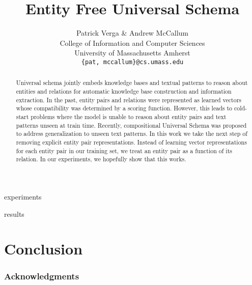 \documentclass{article} %
\title{Entity Free Universal Schema}
\author{Patrick Verga \& Andrew McCallum \\
    College of Information and Computer Sciences\\
    University of Massachusetts Amherst\\
    \texttt{\{pat, mccallum\}@cs.umass.edu} \\
}
\begin{document}
\maketitle

\begin{abstract}
Universal schema jointly embeds knowledge bases and textual patterns to reason about entities and relations for automatic knowledge base construction and information extraction. In the past, entity pairs and relations were represented as learned vectors whose compatibility was determined by a scoring function. However, this leads to cold-start problems where the model is unable to reason about entity pairs and text patterns unseen at train time. Recently, compositional Universal Schema was proposed to address generalization to unseen text patterns. In this work we take the next step of removing explicit entity pair representations. Instead of learning vector representations for each entity pair in our training set, we treat an entity pair as a function of its relation. In our experiments, we hopefully show that this works.
\end{abstract}







 {experiments}

 {results}

\section{Conclusion}


\subsubsection*{Acknowledgments}




\newpage
%
\end{document}
